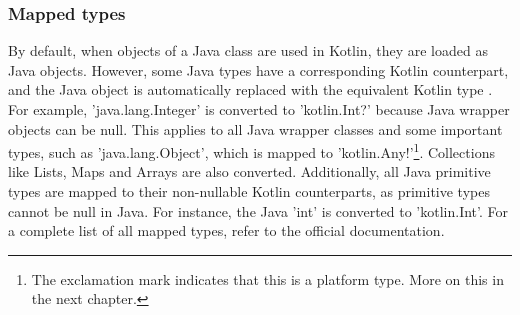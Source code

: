 \documentclass[a4paper, 11pt]{article}
\begin{document}
\subsubsection{Mapped types}
  By default, when objects of a Java class are used in Kotlin, they are loaded as Java objects. However, some Java types have a corresponding Kotlin counterpart, and the Java object is automatically replaced with the equivalent Kotlin type \cite{interop-mapped-types}. For example, 'java.lang.Integer' is converted to 'kotlin.Int?' because Java wrapper objects can be null. This applies to all Java wrapper classes and some important types, such as 'java.lang.Object', which is mapped to 'kotlin.Any!'\footnote{The exclamation mark indicates that this is a platform type. More on this in the next chapter.}. Collections like Lists, Maps and Arrays are also converted. Additionally, all Java primitive types are mapped to their non-nullable Kotlin counterparts, as primitive types cannot be null in Java. For instance, the Java 'int' is converted to 'kotlin.Int'. For a complete list of all mapped types, refer to the official documentation.
\end{document}
